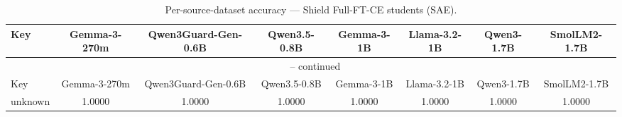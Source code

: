 \begin{landscape}
\begin{longtable}{lccccccc}
\caption{Per-source-dataset accuracy — Shield Full-FT-CE students (SAE).} \\
\label{tab:students_full_ft_ce_per_dataset_sae}
\toprule
Key & Gemma-3-270m & Qwen3Guard-Gen-0.6B & Qwen3.5-0.8B & Gemma-3-1B & Llama-3.2-1B & Qwen3-1.7B & SmolLM2-1.7B \\
\midrule
\endfirsthead
\multicolumn{8}{c}{\tablename\ \thetable{} -- continued} \\
\toprule
Key & Gemma-3-270m & Qwen3Guard-Gen-0.6B & Qwen3.5-0.8B & Gemma-3-1B & Llama-3.2-1B & Qwen3-1.7B & SmolLM2-1.7B \\
\midrule
\endhead
unknown & 1.0000 & 1.0000 & 1.0000 & 1.0000 & 1.0000 & 1.0000 & 1.0000 \\
\bottomrule
\end{longtable}
\end{landscape}